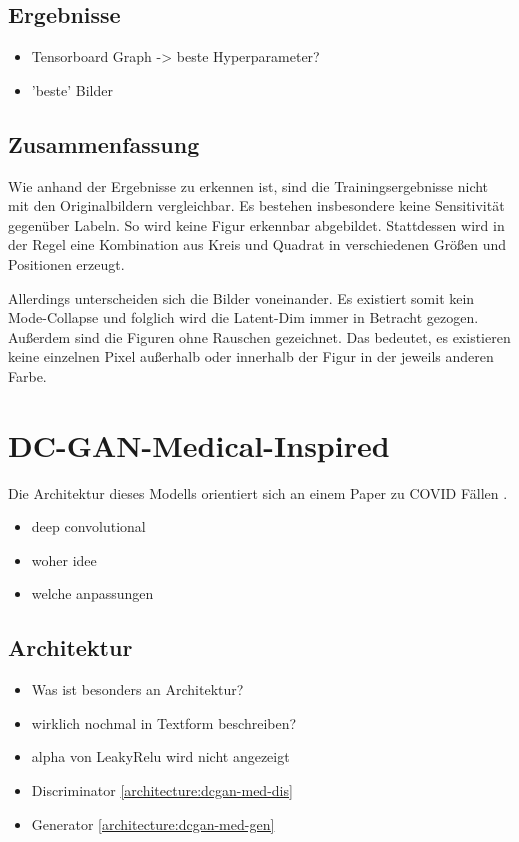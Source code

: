\subsection{Ergebnisse}
\begin{itemize}
	\item Tensorboard Graph -> beste Hyperparameter?
	\item 'beste' Bilder
\end{itemize}

\subsection{Zusammenfassung}
Wie anhand der Ergebnisse zu erkennen ist, sind die Trainingsergebnisse nicht mit den Originalbildern vergleichbar.
Es bestehen insbesondere keine Sensitivität gegenüber Labeln.
So wird keine Figur erkennbar abgebildet.
Stattdessen wird in der Regel eine Kombination aus Kreis und Quadrat in verschiedenen Größen und Positionen erzeugt.
\newline

Allerdings unterscheiden sich die Bilder voneinander.
Es existiert somit kein Mode-Collapse und folglich wird die Latent-Dim immer in Betracht gezogen.
Außerdem sind die Figuren ohne Rauschen gezeichnet.
Das bedeutet, es existieren keine einzelnen Pixel außerhalb oder innerhalb der Figur in der jeweils anderen Farbe.

\section{DC-GAN-Medical-Inspired}

Die Architektur dieses Modells orientiert sich an einem Paper zu COVID Fällen \cite{inspiration-dc-gan-med}.


\begin{itemize}
	\item deep convolutional
	\item woher idee \cite{inspiration-dc-gan-2}
	\item welche anpassungen
\end{itemize}

\subsection{Architektur}
\begin{itemize}
	\item Was ist besonders an Architektur?
	\item wirklich nochmal in Textform beschreiben?
	\item alpha von LeakyRelu wird nicht angezeigt
	\item Discriminator \cref{architecture:dcgan-med-dis}
	\item Generator \cref{architecture:dcgan-med-gen}
\end{itemize}

